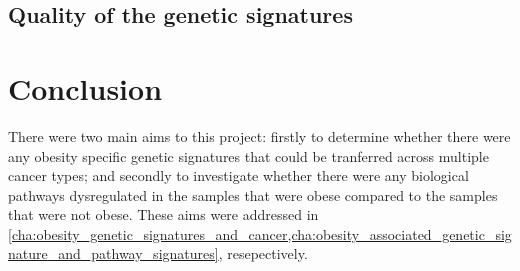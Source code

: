 











\subsection{Quality of the genetic signatures}
\label{sub:quality_of_the_genetic_signatures}










\section{Conclusion}
\label{sec:conclusion}

There were two main aims to this project: firstly to determine whether there were any obesity specific genetic signatures that could be tranferred across multiple cancer types; and secondly to investigate whether there were any biological pathways dysregulated in the samples that were obese compared to the samples that were not obese.
These aims were addressed in \cref{cha:obesity_genetic_signatures_and_cancer,cha:obesity_associated_genetic_signature_and_pathway_signatures}, resepectively.
\\


